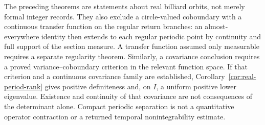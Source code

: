 The preceding theorems are statements about real billiard orbits, not
merely formal integer records. They also exclude a circle-valued
coboundary with a continuous transfer function on the regular return
branches: an almost-everywhere identity then extends to each regular
periodic point by continuity and full support of the section measure.
A transfer function assumed only measurable requires a separate
regularity theorem. Similarly, a covariance conclusion requires a
proved variance--coboundary criterion in the relevant function space.
If that criterion and a continuous covariance family are established,
Corollary~\ref{cor:real-period-rank} gives positive definiteness and,
on $I$, a uniform positive lower eigenvalue. Existence and continuity
of that covariance are not consequences of the determinant alone.
Compact periodic separation is not a quantitative operator contraction
or a returned temporal nonintegrability estimate.

